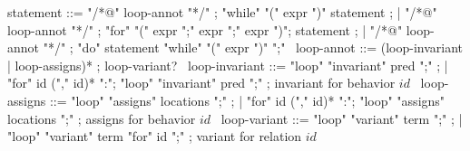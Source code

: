 \begin{syntax}
  statement ::= "/*@" loop-annot "*/" ;
  "while" "(" expr ")" statement ;
  | "/*@" loop-annot "*/" ;
  "for" "(" expr ";" expr ";" expr ")";
  statement ;
  | "/*@" loop-annot "*/" ;
  "do" statement "while" "(" expr ")" ";"
  \
  loop-annot ::= (loop-invariant | loop-assigns)* ;
  loop-variant?
  \
  loop-invariant ::= "loop" "invariant" pred ";" ;
  | {"for" id ("," id)* ":"};
      { "loop" "invariant" pred ";"} ; invariant for behavior $id$
  \
  loop-assigns ::= "loop" "assigns" locations ";" ;
  | {"for" id ("," id)* ":"};
     { "loop" "assigns" locations ";"} ; assigns for behavior $id$
  \
  loop-variant ::= "loop" "variant" term ";" ;
  | "loop" "variant" term "for" id ";" ; variant for relation $id$
\end{syntax}
